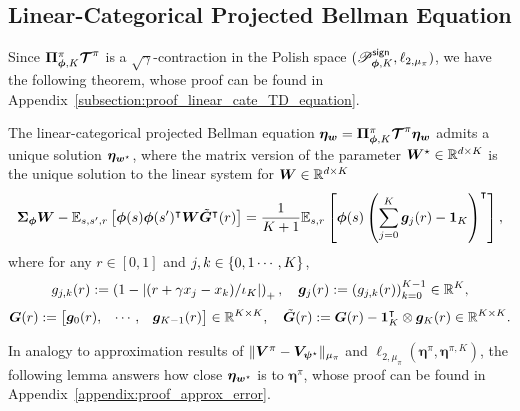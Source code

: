 \subsection{Linear-Categorical Projected Bellman Equation}
Since ${\bm{\Pi}}_{{\bm{\phi}}, K}^{\pi}\bm{\mathcal{T}}^{\pi}$ is a $\sqrt{\gamma}$-contraction in the Polish space $({\mathscr{P}}_{{\bm{\phi}},K}^{\mathsf{sign}},\ell_{2,\mu_\pi})$, we have the following theorem, whose proof can be found in Appendix~\ref{subsection:proof_linear_cate_TD_equation}.
\begin{theorem}\label{thm:linear_cate_TD_equation}
The linear-categorical projected Bellman equation  $\bm{\eta}_{{\bm{w}}}={\bm{\Pi}}_{{\bm{\phi}}, K}^{\pi}\bm{\mathcal{T}}^{\pi}\bm{\eta}_{{\bm{w}}}$ admits a unique solution $\bm{\eta}_{{\bm{w}}^{\star}}$, where the matrix version of the parameter ${\bm{W}}^{\star}\in{\mathbb R}^{d\times K}$ is the unique solution to the linear system for ${\bm{W}}\in{\mathbb R}^{d\times K}$
\begin{equation}\label{eq:fixed_point_equation}
    {\bm{\Sigma}}_{{\bm{\phi}}}{\bm{W}}-{\mathbb E}_{s,s^\prime,r}\left[{{\bm{\phi}}(s){\bm{\phi}}(s^\prime)^{\intercal}{\bm{W}}\tilde{{\bm{G}}}^{\intercal}(r)}\right]=\frac{1}{K+1}{\mathbb E}_{s,r}\left[{{\bm{\phi}}(s)\left({\sum_{j=0}^K{\bm{g}}_j(r)-\bm{1}_{K}}\right)^{\intercal}}\right],
\end{equation}
where for any $r\in[0,1]$ and $j,k\in\left\{{0,1\cdots,K}\right\}$,
\begin{equation*}
     g_{j,k}(r):=\left({1-\left|{(r+\gamma x_j-x_k)/{\iota_K}}\right|}\right)_+, \quad {\bm{g}}_j(r):=\left({g_{j,k}(r)}\right)_{k=0}^{K-1}\in{\mathbb R}^{K},
\end{equation*}
\begin{equation*}
    {\bm{G}}(r):=\begin{bmatrix}
{\bm{g}}_0(r), & \cdots, & {\bm{g}}_{K-1}(r)
\end{bmatrix}\in{\mathbb R}^{K\times K},\quad \tilde{{\bm{G}}}(r):={\bm{G}}(r)-\bm{1}_K^{\intercal}\otimes{\bm{g}}_K(r)\in{\mathbb R}^{K\times K}.
\end{equation*}
\end{theorem}
In analogy to approximation results of $\|{\bm{V}}^\pi-{\bm{V}}_{{\bm{\psi}}^\star} \|_{\mu_\pi}$ and $\ell_{2,\mu_\pi}(\bm{\eta}^\pi,\bm{\eta}^{\pi,K})$, 
the following lemma answers how close $\bm{\eta}_{{\bm{w}}^{\star}}$ is to $\bm{\eta}^\pi$, whose proof can be found in Appendix~\ref{appendix:proof_approx_error}.
